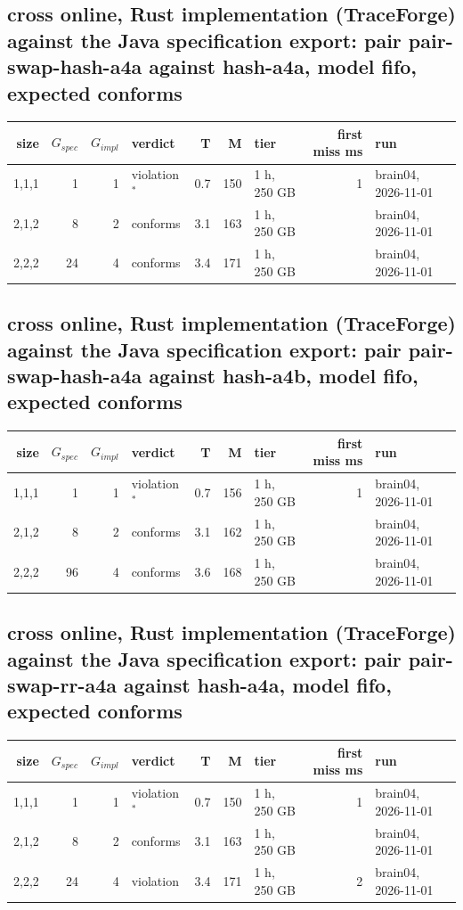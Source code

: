 \documentclass[10pt]{article}
\begin{document}
\subsection*{cross online, Rust implementation (TraceForge) against the Java specification export: pair \textsf{pair-swap-hash-a4a} against \textsf{hash-a4a}, model fifo, expected conforms}
\begin{longtable}{@{}rrrlrrlrl@{}}
\toprule
size & $G_{\mathit{spec}}$ & $G_{\mathit{impl}}$ & verdict & T & M & tier & first miss ms & run \\
\midrule
\endhead
\color{red} 1,1,1 & 1 & 1 & violation$^{\ast}$ & 0.7 & 150 & 1 h, 250 GB & 1 & brain04, 2026-11-01 \\
\color{red} 2,1,2 & 8 & 2 & conforms & 3.1 & 163 & 1 h, 250 GB &  & brain04, 2026-11-01 \\
\color{red} 2,2,2 & 24 & 4 & conforms & 3.4 & 171 & 1 h, 250 GB &  & brain04, 2026-11-01 \\
\bottomrule
\end{longtable}
\subsection*{cross online, Rust implementation (TraceForge) against the Java specification export: pair \textsf{pair-swap-hash-a4a} against \textsf{hash-a4b}, model fifo, expected conforms}
\begin{longtable}{@{}rrrlrrlrl@{}}
\toprule
size & $G_{\mathit{spec}}$ & $G_{\mathit{impl}}$ & verdict & T & M & tier & first miss ms & run \\
\midrule
\endhead
\color{red} 1,1,1 & 1 & 1 & violation$^{\ast}$ & 0.7 & 156 & 1 h, 250 GB & 1 & brain04, 2026-11-01 \\
\color{red} 2,1,2 & 8 & 2 & conforms & 3.1 & 162 & 1 h, 250 GB &  & brain04, 2026-11-01 \\
\color{red} 2,2,2 & 96 & 4 & conforms & 3.6 & 168 & 1 h, 250 GB &  & brain04, 2026-11-01 \\
\bottomrule
\end{longtable}
\subsection*{cross online, Rust implementation (TraceForge) against the Java specification export: pair \textsf{pair-swap-rr-a4a} against \textsf{hash-a4a}, model fifo, expected conforms}
\begin{longtable}{@{}rrrlrrlrl@{}}
\toprule
size & $G_{\mathit{spec}}$ & $G_{\mathit{impl}}$ & verdict & T & M & tier & first miss ms & run \\
\midrule
\endhead
\color{red} 1,1,1 & 1 & 1 & violation$^{\ast}$ & 0.7 & 150 & 1 h, 250 GB & 1 & brain04, 2026-11-01 \\
\color{red} 2,1,2 & 8 & 2 & conforms & 3.1 & 163 & 1 h, 250 GB &  & brain04, 2026-11-01 \\
\color{red} 2,2,2 & 24 & 4 & violation & 3.4 & 171 & 1 h, 250 GB & 2 & brain04, 2026-11-01 \\
\bottomrule
\end{longtable}
\end{document}
